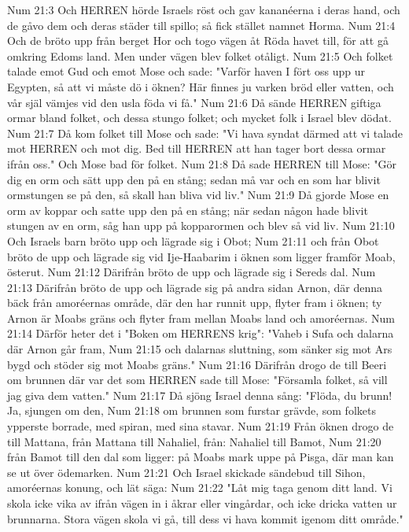 Num 21:3  Och HERREN hörde Israels röst och gav kananéerna i deras hand, och de gåvo dem och deras städer till spillo; så fick stället namnet Horma.
Num 21:4  Och de bröto upp från berget Hor och togo vägen åt Röda havet till, för att gå omkring Edoms land. Men under vägen blev folket otåligt.
Num 21:5  Och folket talade emot Gud och emot Mose och sade: "Varför haven I fört oss upp ur Egypten, så att vi måste dö i öknen? Här finnes ju varken bröd eller vatten, och vår själ vämjes vid den usla föda vi få."
Num 21:6  Då sände HERREN giftiga ormar bland folket, och dessa stungo folket; och mycket folk i Israel blev dödat.
Num 21:7  Då kom folket till Mose och sade: "Vi hava syndat därmed att vi talade mot HERREN och mot dig. Bed till HERREN att han tager bort dessa ormar ifrån oss." Och Mose bad för folket.
Num 21:8  Då sade HERREN till Mose: "Gör dig en orm och sätt upp den på en stång; sedan må var och en som har blivit ormstungen se på den, så skall han bliva vid liv."
Num 21:9  Då gjorde Mose en orm av koppar och satte upp den på en stång; när sedan någon hade blivit stungen av en orm, såg han upp på kopparormen och blev så vid liv.
Num 21:10  Och Israels barn bröto upp och lägrade sig i Obot;
Num 21:11  och från Obot bröto de upp och lägrade sig vid Ije-Haabarim i öknen som ligger framför Moab, österut.
Num 21:12  Därifrån bröto de upp och lägrade sig i Sereds dal.
Num 21:13  Därifrån bröto de upp och lägrade sig på andra sidan Arnon, där denna bäck från amoréernas område, där den har runnit upp, flyter fram i öknen; ty Arnon är Moabs gräns och flyter fram mellan Moabs land och amoréernas.
Num 21:14  Därför heter det i "Boken om HERRENS krig": "Vaheb i Sufa och dalarna där Arnon går fram,
Num 21:15  och dalarnas sluttning, som sänker sig mot Ars bygd och stöder sig mot Moabs gräns."
Num 21:16  Därifrån drogo de till Beeri om brunnen där var det som HERREN sade till Mose: "Församla folket, så vill jag giva dem vatten."
Num 21:17  Då sjöng Israel denna sång: "Flöda, du brunn! Ja, sjungen om den,
Num 21:18  om brunnen som furstar grävde, som folkets ypperste borrade, med spiran, med sina stavar.
Num 21:19  Från öknen drogo de till Mattana, från Mattana till Nahaliel, från: Nahaliel till Bamot,
Num 21:20  från Bamot till den dal som ligger: på Moabs mark uppe på Pisga, där man kan se ut över ödemarken.
Num 21:21  Och Israel skickade sändebud till Sihon, amoréernas konung, och lät säga:
Num 21:22  "Låt mig taga genom ditt land. Vi skola icke vika av ifrån vägen in i åkrar eller vingårdar, och icke dricka vatten ur brunnarna. Stora vägen skola vi gå, till dess vi hava kommit igenom ditt område."
